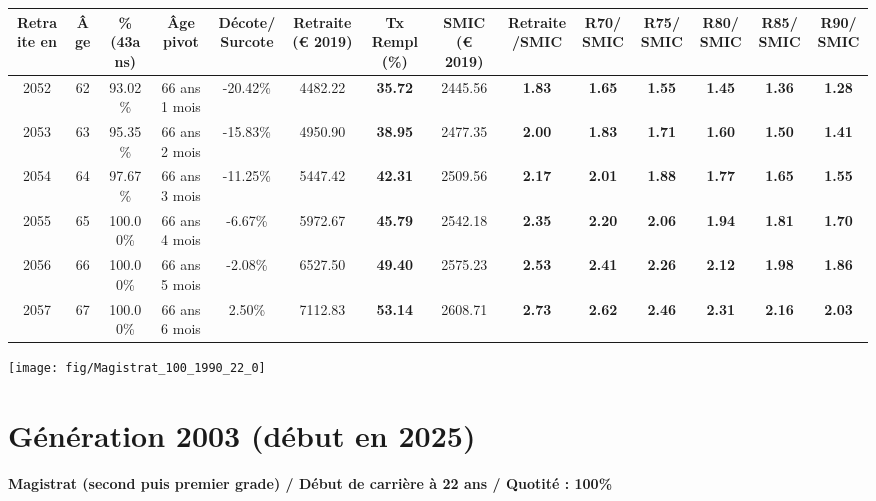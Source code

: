 \begin{adjustbox}{max width=\textwidth} 
\begin{tabular}[htb]{|c|c||c|c|c||c|c||c|c||c|c|c|c|c|} 
\hline 
 Retraite en &  Âge &  \%(43ans) &  Âge pivot &  Décote/Surcote &  Retraite (\euro{} 2019) &  Tx Rempl(\%) &  SMIC (\euro{} 2019) &  Retraite/SMIC &  R70/SMIC &  R75/SMIC &  R80/SMIC &  R85/SMIC &  R90/SMIC \\ 
\hline \hline 
 2052 &  62 &  93.02\% &  66 ans 1 mois &  -20.42\% &  4482.22 &  {\bf 35.72} &  2445.56 &  {\bf 1.83} &  {\bf 1.65} &  {\bf 1.55} &  {\bf 1.45} &  {\bf 1.36} &  {\bf 1.28} \\ 
\hline 
 2053 &  63 &  95.35\% &  66 ans 2 mois &  -15.83\% &  4950.90 &  {\bf 38.95} &  2477.35 &  {\bf 2.00} &  {\bf 1.83} &  {\bf 1.71} &  {\bf 1.60} &  {\bf 1.50} &  {\bf 1.41} \\ 
\hline 
 2054 &  64 &  97.67\% &  66 ans 3 mois &  -11.25\% &  5447.42 &  {\bf 42.31} &  2509.56 &  {\bf 2.17} &  {\bf 2.01} &  {\bf 1.88} &  {\bf 1.77} &  {\bf 1.65} &  {\bf 1.55} \\ 
\hline 
 2055 &  65 &  100.00\% &  66 ans 4 mois &  -6.67\% &  5972.67 &  {\bf 45.79} &  2542.18 &  {\bf 2.35} &  {\bf 2.20} &  {\bf 2.06} &  {\bf 1.94} &  {\bf 1.81} &  {\bf 1.70} \\ 
\hline 
 2056 &  66 &  100.00\% &  66 ans 5 mois &  -2.08\% &  6527.50 &  {\bf 49.40} &  2575.23 &  {\bf 2.53} &  {\bf 2.41} &  {\bf 2.26} &  {\bf 2.12} &  {\bf 1.98} &  {\bf 1.86} \\ 
\hline 
 2057 &  67 &  100.00\% &  66 ans 6 mois &  2.50\% &  7112.83 &  {\bf 53.14} &  2608.71 &  {\bf 2.73} &  {\bf 2.62} &  {\bf 2.46} &  {\bf 2.31} &  {\bf 2.16} &  {\bf 2.03} \\ 
\hline 
\hline 
\end{tabular} 
\end{adjustbox} 
 
 \vspace{0.1cm} 

 {\hspace{-2.2cm}\texttt{[image: fig/Magistrat\_100\_1990\_22\_0]}} 

\newpage 
 
\section{Génération 2003 (début en 2025)\label{Magistrat_100_2003_22_0}} 
 
{\bf \noindent Magistrat (second puis premier grade) / Début de carrière à 22 ans / Quotité : 100\%}  ~ 


